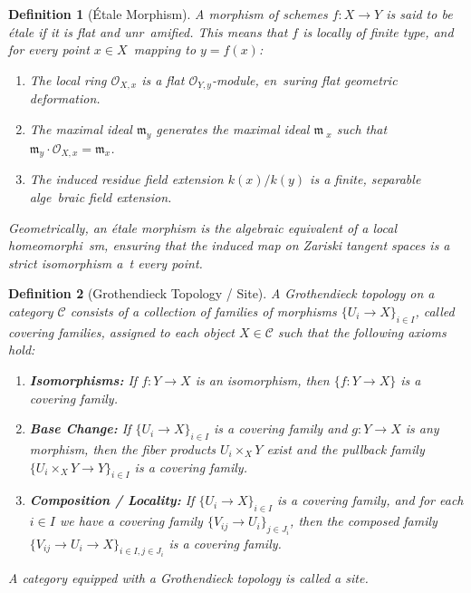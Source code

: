 \documentclass[11pt,oneside]{article}
\newtheorem{definition}{Definition}[section]
\begin{document}
\begin{definition}[{\'E}tale Morphism]
A morphism of schemes $f: X \to Y$ is said to be \emph{\'etale} if it is flat and unr\
amified. This means that $f$ is locally of finite type, and for every point $x \in X$\
 mapping to $y = f(x)$:
\begin{enumerate}
    \item The local ring $\mathcal{O}_{X,x}$ is a flat $\mathcal{O}_{Y,y}$-module, en\
suring flat geometric deformation.
    \item The maximal ideal $\mathfrak{m}_y$ generates the maximal ideal $\mathfrak{m\
}_x$ such that $\mathfrak{m}_y \cdot \mathcal{O}_{X,x} = \mathfrak{m}_x$.
    \item The induced residue field extension $k(x)/k(y)$ is a finite, separable alge\
braic field extension.
\end{enumerate}
Geometrically, an \'etale morphism is the algebraic equivalent of a local homeomorphi\
sm, ensuring that the induced map on Zariski tangent spaces is a strict isomorphism a\
t every point.
\end{definition}

\begin{definition}[Grothendieck Topology / Site]
A \emph{Grothendieck topology} on a category $\mathcal{C}$ consists of a collection of
families of morphisms $\{U_i \to X\}_{i \in I}$, called \emph{covering families}, assigned to
each object $X \in \mathcal{C}$ such that the following axioms hold:
\begin{enumerate}
\item \textbf{Isomorphisms:} If $f: Y \to X$ is an isomorphism, then $\{f: Y \to X\}$ is a
covering family.
\item \textbf{Base Change:} If $\{U_i \to X\}_{i \in I}$ is a covering family and
  $g: Y \to X$ is any morphism, then the fiber products $U_i \times_X Y$ exist and the pullback
  family $\{U_i \times_X Y \to Y\}_{i \in I}$ is a covering family.
\item \textbf{Composition / Locality:} If $\{U_i \to X\}_{i \in I}$ is a covering family,
  and for each $i \in I$ we have a covering family $\{V_{ij} \to U_i\}_{j \in J_i}$, then the
  composed family $\{V_{ij} \to U_i \to X\}_{i \in I, j \in J_i}$ is a covering family.
\end{enumerate}
A category equipped with a Grothendieck topology is called a \emph{site}.
\end{definition}
\end{document}
